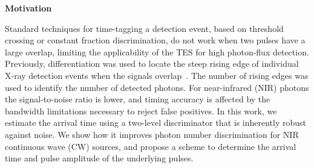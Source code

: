 \vspace{-1cm}
\begin{center}
  \begin{center} {\bf \Large \textsf {Motivation}}\end{center}
\end{center}
Standard techniques for time-tagging a detection event, based on threshold crossing or constant fraction discrimination, do not work when two pulses have a large overlap, limiting the applicability of the TES for high photon-flux detection.
%
Previously, differentiation was used to locate the steep rising edge of individual X-ray detection events when the signals overlap~\cite{Fowler:2015ef}.
%
The number of rising edges was used
to identify the number of detected photons.
%
For near-infrared (NIR) photons the signal-to-noise ratio is lower, and timing accuracy is affected by the bandwidth limitations necessary to reject false positives.
%
In this work, we estimate the arrival time using a two-level discriminator that is inherently robust against noise.
We show how it
improves photon number discrimination for NIR continuous wave (CW) sources,
and propose a scheme to determine the arrival time and pulse amplitude of the underlying pulses.